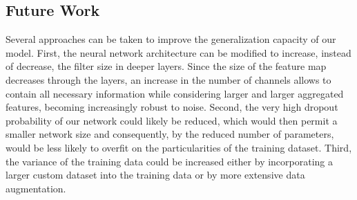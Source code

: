 \documentclass[a4paper]{article}
\begin{document}
\subsection{Future Work}
Several approaches can be taken to improve the generalization capacity of our model. First, the neural network architecture can be modified to increase, instead of decrease, the filter size in deeper layers. Since the size of the feature map decreases through the layers, an increase in the number of channels allows to contain all necessary information while considering larger and larger aggregated features, becoming increasingly robust to noise. Second, the very high dropout probability of our network could likely be reduced, which would then permit a smaller network size and consequently, by the reduced number of parameters, would be less likely to overfit on the particularities of the training dataset. Third, the variance of the training data could be increased either by incorporating a larger custom dataset into the training data or by more  extensive data augmentation.


\end{document}
